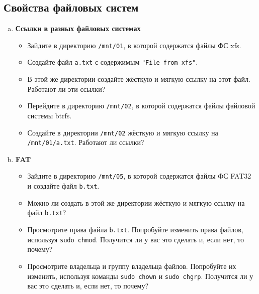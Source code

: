 \documentclass{article}
\begin{document}
\subsection{Свойства файловых систем}
\begin{enumerate}[(a)]
\item \textbf{Ссылки в разных файловых системах}
\begin{itemize}
\item Зайдите в директорию \texttt{/mnt/01}, в которой содержатся файлы ФС xfs.
\item Создайте файл \texttt{a.txt} с содержимым \texttt{"File from xfs"}.
\item В этой же директории создайте жёсткую и мягкую ссылку на этот файл. Работают ли эти ссылки?
\item Перейдите в директорию \texttt{/mnt/02}, в которой содержатся файлы файловой системы btrfs.
\item Создайте в директории \texttt{/mnt/02} жёсткую и мягкую ссылку на \texttt{/mnt/01/a.txt}. Работают ли ссылки?
\end{itemize}


\item \textbf{FAT}
\begin{itemize}
\item Зайдите в директорию \texttt{/mnt/05}, в которой содержатся файлы ФС FAT32 и создайте файл \texttt{b.txt}.
\item Можно ли создать в этой же директории жёсткую и мягкую ссылку на файл \texttt{b.txt}?
\item Просмотрите права файла \texttt{b.txt}. Попробуйте изменить права файлов, используя \texttt{sudo chmod}. Получится ли у вас это сделать и, если нет, то почему?
\item Просмотрите владельца и группу владельца файлов. Попробуйте их изменить, используя команды \texttt{sudo chown} и \texttt{sudo chgrp}. Получится ли у вас это сделать и, если нет, то почему?
\iffalse
\item Используйте \texttt{stat}, чтобы распечатать метаданные файлов \texttt{a.txt} и \texttt{alpha}.
\fi
\end{itemize}


\end{enumerate}
\end{document}
